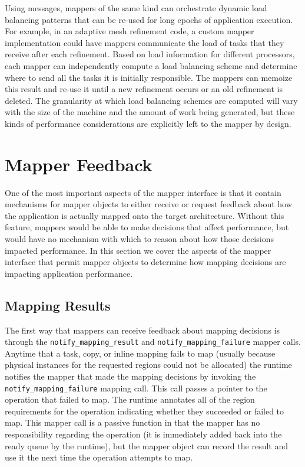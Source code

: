 Using messages, mappers of the same kind can
orchestrate dynamic load balancing patterns that
can be re-used for long epochs of application
execution. For example, in an adaptive mesh
refinement code, a custom mapper implementation
could have mappers communicate the load of tasks
that they receive after each refinement.  Based
on load information for different processors,
each mapper can independently compute a load
balancing scheme and determine where to send all
the tasks it is initially responsible.  The
mappers can memoize this result and re-use it
until a new refinement occurs or an old refinement
is deleted. The granularity at which load balancing
schemes are computed will vary with the size of
the machine and the amount of work being generated,
but these kinds of performance considerations are
explicitly left to the mapper by design.


\section{Mapper Feedback}
\label{sec:feedback}
One of the most important aspects of the mapper
interface is that it contain mechanisms for mapper
objects to either receive or request feedback
about how the application is actually mapped
onto the target architecture. Without this feature,
mappers would be able to make decisions that
affect performance, but would have no mechanism
with which to reason about how those decisions
impacted performance. In this section we cover
the aspects of the mapper interface that permit
mapper objects to determine how mapping
decisions are impacting application performance.

\subsection{Mapping Results}
\label{subsec:mapresults}
The first way that mappers can receive feedback
about mapping decisions is through the 
{\tt notify\_mapping\_result} and 
{\tt notify\_mapping\_failure} mapper calls.
Anytime that a task, copy, or inline mapping
fails to map (usually because physical instances
for the requested regions could not be 
allocated) the runtime notifies the mapper that
made the mapping decisions by invoking the
{\tt notify\_mapping\_failure} mapping call.
This call passes a pointer to the operation
that failed to map.  The runtime annotates
all of the region requirements for the operation
indicating whether they succeeded or failed
to map. This mapper call is a passive function
in that the mapper has no responsibility regarding
the operation (it is immediately added back into
the ready queue by the runtime), but the mapper
object can record the result and use it the
next time the operation attempts to map.

